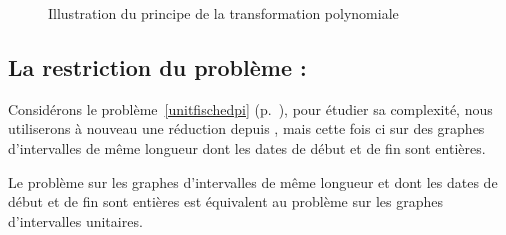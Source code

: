 \documentclass[a4paper,9pt]{report}
\begin{document}
\begin{ex}
\begin{figure}
\begin{center}
\begin{minipage}[c][5cm][c]{0.55\linewidth}
        \end{minipage}
    \end{center}
    \caption{Illustration du principe de la transformation polynomiale}
    \label{fig_transpoly}
\end{figure}
\end{ex}

\subsection{La restriction du problème : \unitfischedpi}
\label{sspb_comp}

Considérons le problème~\ref{unitfischedpi} (p.~\pageref{unitfischedpi}), pour étudier sa
complexité, nous utiliserons à nouveau une réduction depuis \precolor, mais cette fois ci sur des
graphes d'intervalles de même longueur dont les dates de début et de fin sont entières.

\begin{nprop}
    Le problème \precolor sur les graphes d'intervalles de même longueur et dont les dates de début
    et de fin sont entières est équivalent au problème \precolor sur les graphes d'intervalles
    unitaires.
\end{nprop}
\end{document}
